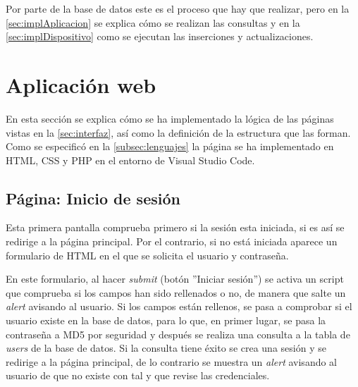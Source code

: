 Por parte de la base de datos este es el proceso que hay que realizar, pero en la \autoref{sec:implAplicacion} se explica cómo se realizan las consultas y en la \autoref{sec:implDispositivo} como se ejecutan las inserciones y actualizaciones.

\section{Aplicación web}\label{sec:implAplicacion}
En esta sección se explica cómo se ha implementado la lógica de las páginas vistas en la \autoref{sec:interfaz}, así como la definición de la estructura que las forman. Como se especificó en la \autoref{subsec:lenguajes} la página se ha implementado en HTML, CSS y PHP en el entorno de Visual Studio Code.

\subsection{Página: Inicio de sesión}\label{subsec:página-inicio-de-sesión}
Esta primera pantalla comprueba primero si la sesión esta iniciada, si es así se redirige a la página principal. Por el contrario, si no está iniciada aparece un formulario de HTML en el que se solicita el usuario y contraseña. 

En este formulario, al hacer \textit{submit} (botón ''Iniciar sesión'') se activa un script que comprueba si los campos han sido rellenados o no, de manera que salte un \textit{alert} avisando al usuario. Si los campos están rellenos, se pasa a comprobar si el usuario existe en la base de datos, para lo que, en primer lugar, se pasa la contraseña a MD5 por seguridad y después se realiza una consulta a la tabla de \textit{users} de la base de datos. Si la consulta tiene éxito se crea una sesión y se redirige a la página principal, de lo contrario se muestra un \textit{alert} avisando al usuario de que no existe con tal y que revise las credenciales.


